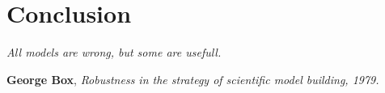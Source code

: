 \documentclass[12pt,french]{report}
\begin{document}


\chapter*{Conclusion}
\begin{flushleft}
\textit{All models are wrong, but some are usefull.}
\end{flushleft}
\begin{flushright}
\textbf{George Box}, \textit{Robustness in the strategy of scientific model building, 1979.}
\end{flushright}
\pagestyle{Conclusion}

%
\end{document}
